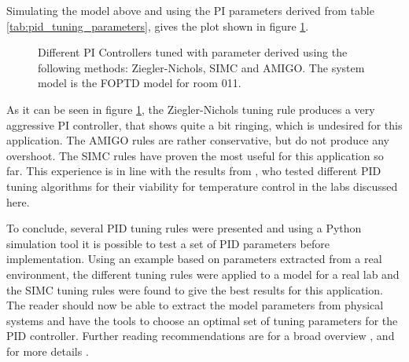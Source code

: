 Simulating the model above and using the PI parameters derived from table \ref{tab:pid_tuning_parameters}, gives the plot shown in figure \ref{fig:pid_controller_comparison}.

\begin{figure}[ht]
    \centering
    
    \caption{Different PI Controllers tuned with parameter derived using the following methods: Ziegler-Nichols, SIMC and AMIGO. The system model is the FOPTD model for room 011.}
    \label{fig:pid_controller_comparison}
\end{figure}

As it can be seen in figure \ref{fig:pid_controller_comparison}, the Ziegler-Nichols tuning rule produces a very aggressive PI controller, that shows quite a bit ringing, which is undesired for this application. The AMIGO rules are rather conservative, but do not produce any overshoot. The SIMC rules have proven the most useful for this application so far. This experience is in line with the results from \citeauthor{liebmann_thesis} \cite{liebmann_thesis}, who tested different PID tuning algorithms for their viability for temperature control in the labs discussed here.

To conclude, several PID tuning rules were presented and using a Python simulation tool it is possible to test a set of PID parameters before implementation. Using an example based on parameters extracted from a real environment, the different tuning rules were applied to a model for a real lab and the SIMC tuning rules were found to give the best results for this application. The reader should now be able to extract the model parameters from physical systems and have the tools to choose an optimal set of tuning parameters for the PID controller. Further reading recommendations are for a broad overview \cite{pid_controller}, and for more details \cite{advanced_pid_control}.

\clearpage
